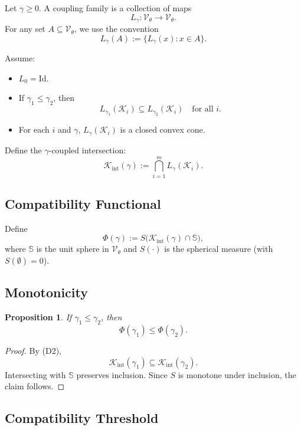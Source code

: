 \documentclass[11pt,a4paper,twocolumn]{article}
\newtheorem{proposition}{Proposition}
\begin{document}
Let $\gamma \ge 0$.
A coupling family is a collection of maps
\[
L_\gamma : \mathcal{V}_\theta \to \mathcal{V}_\theta.
\]
For any set $A\subseteq \mathcal{V}_\theta$, we use the convention
\[
L_\gamma(A) := \{ L_\gamma(x) : x\in A\}.
\]

Assume:

\begin{itemize}
 \item[(D1)] $L_0 = \mathrm{Id}$.
 \item[(D2)] If $\gamma_1 \le \gamma_2$, then
 \[
 L_{\gamma_1}(\mathcal{K}_i)
 \subseteq
 L_{\gamma_2}(\mathcal{K}_i)
 \quad \text{for all } i.
 \]
 \item[(D3)] For each $i$ and $\gamma$, $L_\gamma(\mathcal{K}_i)$ is a closed convex cone.
\end{itemize}

Define the $\gamma$-coupled intersection:
\[
\mathcal{K}_{\mathrm{int}}(\gamma)
:=
\bigcap_{i=1}^m
L_\gamma(\mathcal{K}_i).
\]

\subsection{Compatibility Functional}

Define
\[
\Phi(\gamma)
:=
S\big(\mathcal{K}_{\mathrm{int}}(\gamma)\cap \mathbb{S}\big),
\]
where $\mathbb{S}$ is the unit sphere in $\mathcal{V}_\theta$ and $S(\cdot)$ is the spherical measure
(with $S(\emptyset)=0$).

\subsection{Monotonicity}

\begin{proposition}
 If $\gamma_1 \le \gamma_2$, then
 \[
 \Phi(\gamma_1)
 \le
 \Phi(\gamma_2).
 \]
\end{proposition}

\begin{proof}
 By (D2),
 \[
 \mathcal{K}_{\mathrm{int}}(\gamma_1)
 \subseteq
 \mathcal{K}_{\mathrm{int}}(\gamma_2).
 \]
 Intersecting with $\mathbb{S}$ preserves inclusion. Since $S$ is monotone under inclusion, the claim follows.
\end{proof}

\subsection{Compatibility Threshold}
\end{document}
